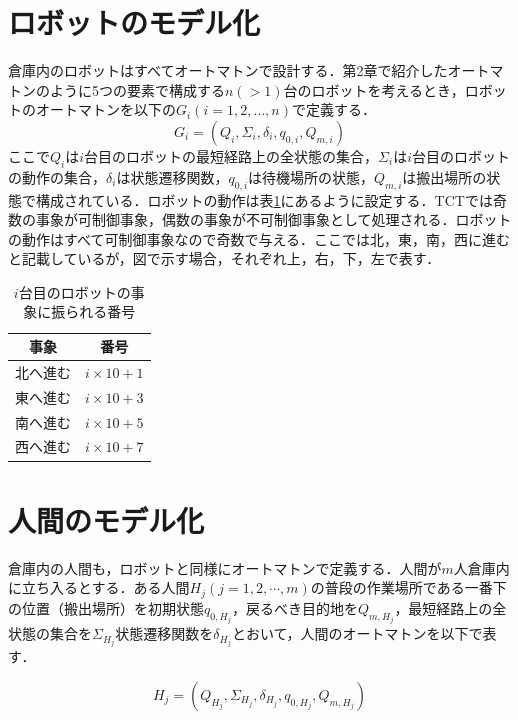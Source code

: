 \section{ロボットのモデル化}\label{sec:design_robot}

倉庫内のロボットはすべてオートマトンで設計する．第2章で紹介したオートマトンのように5つの要素で構成する$n(>1)$台のロボットを考えるとき，ロボットのオートマトンを以下の$G_i(i=1,2,\ldots,n)$で定義する．
\begin{equation}
    G_i=(Q_i,\Sigma_i,\delta_i,q_{0,i},Q_{m,i})
\end{equation}
ここで$Q_i$は$i$台目のロボットの最短経路上の全状態の集合，$\Sigma_i$は$i$台目のロボットの動作の集合，$\delta_i$は状態遷移関数，$q_{0,i}$は待機場所の状態，$Q_{m,i}$は搬出場所の状態で構成されている．ロボットの動作は表\ref{tb:event_numbers}にあるように設定する．TCTでは奇数の事象が可制御事象，偶数の事象が不可制御事象として処理される．ロボットの動作はすべて可制御事象なので奇数で与える．ここでは北，東，南，西に進むと記載しているが，図で示す場合，それぞれ上，右，下，左で表す．

\begin{table}[htb]
    \centering
    \begin{tabular}{|c|c|} \hline
        事象 & 番号 \\ \hline
        北へ進む & $i\times10+1$ \\
        東へ進む & $i\times10+3$ \\
        南へ進む & $i\times10+5$ \\
        西へ進む & $i\times10+7$ \\ \hline
    \end{tabular}
    \caption{$i$台目のロボットの事象に振られる番号}
    \label{tb:event_numbers}
\end{table}

\section{人間のモデル化}

倉庫内の人間も，ロボットと同様にオートマトンで定義する．人間が$m$人倉庫内に立ち入るとする．ある人間$H_j(j=1,2,\cdots ,m)$の普段の作業場所である一番下の位置（搬出場所）を初期状態$q_{0,H_j}$，戻るべき目的地を$Q_{m,H_j}$，最短経路上の全状態の集合を$\Sigma_{H_j}$状態遷移関数を$\delta_{H_j}$とおいて，人間のオートマトンを以下で表す．

\begin{equation}
H_j=(Q_{H_j},\Sigma_{H_j},\delta_{H_j},q_{0,H_j},Q_{m,H_j})
\end{equation}

